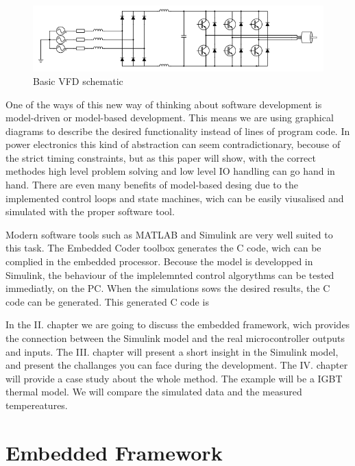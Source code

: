 \begin{figure}[h]
\centering
\includegraphics[width=0.8\columnwidth]{figures/VFDschematic}

\caption{Basic VFD schematic}
\label{vfd_sch}
\end{figure}

One of the ways of this new way of thinking about software development is model-driven or model-based development. This means we are using graphical diagrams to describe the desired functionality instead of lines of program code. In power electronics this kind of abstraction can seem contradictionary, becouse  of the strict timing constraints, but as this paper will show, with the correct methodes high level problem solving and low level IO handling can go hand in hand. There are even many benefits of model-based desing due to the implemented control loops and state machines, wich can be easily viusalised and simulated with the proper software tool.

Modern software tools such as MATLAB and Simulink are very well suited to this task. The Embedded Coder toolbox generates the C code, wich can be complied in the embedded processor. Becouse the model is developped in Simulink, the behaviour of the implelemnted control algorythms can be tested immediatly, on the PC. When the simulations sows the desired results, the C code can be generated. This generated C code is 

In the II. chapter we are going to discuss the embedded framework, wich provides the connection between the Simulink model and the real microcontroller outputs and inputs. The III. chapter will present a short insight in the Simulink model, and present the challanges you can face during the development. The IV. chapter will provide a case study about the whole method. The example will be a IGBT thermal model. We will compare the simulated data and the measured tempereatures.


\section{Embedded Framework}

